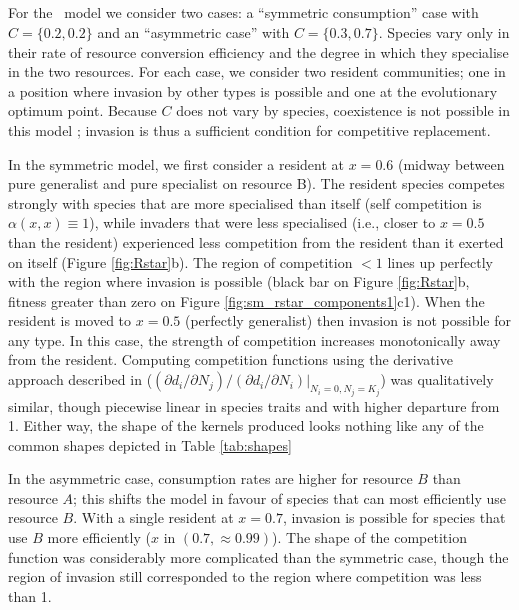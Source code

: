\documentclass[a4paper,11pt]{article}
\begin{document}
\subsection{\Rstar}

For the \Rstar\ model we consider two cases: a ``symmetric
consumption'' case with $C = \{0.2, 0.2\}$ and an ``asymmetric case''
with $C = \{0.3, 0.7\}$.  Species vary only in their rate of resource
conversion efficiency and the degree in which they specialise in the
two resources.  For each case, we consider two resident communities;
one in a position where invasion by other types is possible and one at
the evolutionary optimum point.
%
Because $C$ does not vary by species, coexistence is not possible in
this model \citep{Tilman-1982}; invasion is thus a sufficient condition for
competitive replacement.

In the symmetric model, we first consider a resident at $x = 0.6$
(midway between pure generalist and pure specialist on resource B).
%
The resident species competes strongly with species that are more
specialised than itself (self competition is $\alpha(x, x) \equiv
1$), while invaders that were less specialised (i.e., closer to $x =
0.5$ than the resident) experienced less competition from the resident
than it exerted on itself (Figure \ref{fig:Rstar}b).
%
The region of competition $< 1$ lines up perfectly with the region
where invasion is possible (black bar on Figure \ref{fig:Rstar}b,
fitness greater than zero on Figure
\ref{fig:sm_rstar_components1}c1).
%
When the resident is moved to $x = 0.5$ (perfectly generalist) then
invasion is not possible for any type.  In this case, the strength of
competition increases monotonically away from the resident.
%
Computing competition functions using the derivative approach
described in \citet{Abrams-2008}
($(\partial d_i / \partial N_j) / (\partial d_i / \partial N_i) |_{N_i
  = 0, N_j = K_j}$)
was qualitatively similar, though piecewise linear in species traits
and with higher departure from 1. 
Either way, the shape of the kernels produced looks nothing like any of the
common shapes depicted in Table \ref{tab:shapes}

In the asymmetric case, consumption rates are higher for
resource $B$ than resource $A$; this shifts the model in favour of
species that can most efficiently use resource $B$.
%
With a single resident at $x = 0.7$, invasion is possible for species
that use $B$ more efficiently ($x$ in $(0.7, \approx 0.99)$).
%
The shape of the competition function was considerably more
complicated than the symmetric case, though the region of invasion
still corresponded to the region where competition was less than 1.
\end{document}
